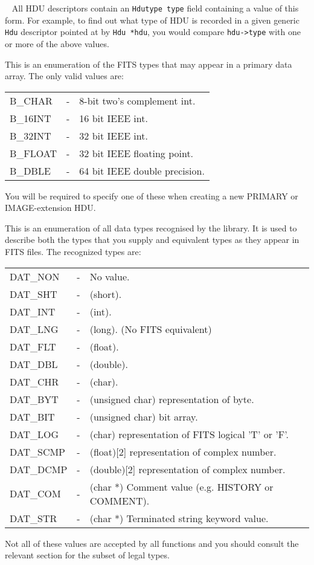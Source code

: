 \begin{list}{\ }{ \leftmargin {} \addtolength{\leftmargin}{\labelsep}}
        All HDU descriptors contain an \verb`Hdutype type` field containing
        a value of this form. For example, to find out what type of
        HDU is recorded in a given generic \verb`Hdu` descriptor pointed at
        by \verb`Hdu *hdu`, you would compare  \verb`hdu->type`  with one
        or more of the above values. 

\label{Bitpix} This is an enumeration of the FITS types
that may appear in a primary data array. The only valid values
are:\nopagebreak

	\begin{tabular}{lcl}
	  B\_CHAR  & - & 8-bit two's complement int. \\
	  B\_16INT & - & 16 bit IEEE int. \\
	  B\_32INT & - & 32 bit IEEE int. \\
	  B\_FLOAT & - & 32 bit IEEE floating point. \\
	  B\_DBLE  & - & 64 bit IEEE double precision. \\
        \end{tabular}

        You will be required to specify one of these when creating a new
        PRIMARY or IMAGE-extension HDU.


\label{Fittype} This is an enumeration of all
        data types recognised by the library. It is used to describe
        both the types that you supply and equivalent types as they
        appear in FITS files. The recognized types are:\nopagebreak

	\begin{tabular}{lcl}
	  DAT\_NON  & - &  No value. \\
	  DAT\_SHT  & - &  (short). \\
	  DAT\_INT  & - &  (int). \\
	  DAT\_LNG  & - &  (long). (No FITS equivalent) \\
	  DAT\_FLT  & - &  (float). \\
	  DAT\_DBL  & - &  (double). \\
	  DAT\_CHR  & - &  (char). \\
	  DAT\_BYT  & - &  (unsigned char) representation of byte. \\
	  DAT\_BIT  & - &  (unsigned char) bit array. \\
	  DAT\_LOG  & - &  (char) representation of FITS logical 'T' or 'F'. \\
	  DAT\_SCMP & - &  (float)[2] representation of complex number. \\
	  DAT\_DCMP & - &  (double)[2] representation of complex number. \\
	  DAT\_COM  & - &  (char *) Comment value (e.g. HISTORY or COMMENT). \\
	  DAT\_STR  & - &  (char *) Terminated string keyword value. \\
	\end{tabular}

        Not all of these values are accepted by all functions and
        you should consult the relevant section for the subset of
        legal types.
\end{list}


